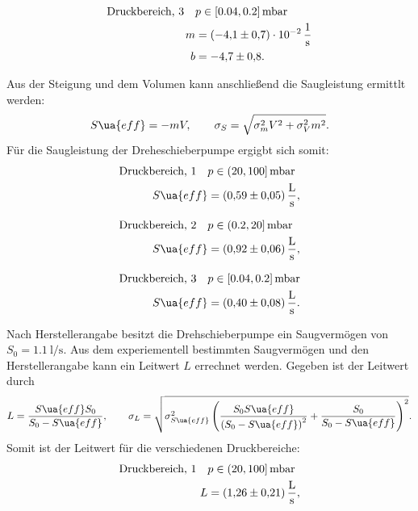 \begin{align}
  \label{eq: regression_dreh_druck_3}
  \begin{aligned}
  \text{Druckbereich, 3} \quad &p\in[0.04,0.2]\,\si{\milli\bar} \\
  m&=\SI{-4.1\pm0.7 e-2}{\per\second} \\
  b&=\num{-4.7 \pm0.8 }.
\end{aligned}
\end{align}

Aus der Steigung und dem Volumen kann anschließend die Saugleistung ermittlt werden:
\begin{equation}
  \label{eq: saug_druck}
  S\ua{eff}=-mV, \qquad \sigma_{S}=\sqrt{\sigma_{m}^{2} V^{2} + \sigma_{V}^{2} m^{2}}.
\end{equation}
Für die Saugleistung der Dreheschieberpumpe ergigbt sich somit:
\begin{align}
  \label{eq:dreh_saug_1}
  \begin{aligned}
  \text{Druckbereich, 1} \quad  &p\in(20,100]\,\si{\milli\bar} \\
   S\ua{eff}&=\SI{0.59\pm 0.05}{\litre\per\second},
\end{aligned}
\end{align}

\begin{align}
  \label{eq:dreh_saug_2}
  \begin{aligned}
  \text{Druckbereich, 2} \quad  &p\in(0.2,20]\,\si{\milli\bar} \\
   S\ua{eff}&=\SI{0.92\pm 0.06}{\litre\per\second},
\end{aligned}
\end{align}

\begin{align}
  \label{eq:dreh_saug_3}
  \begin{aligned}
  \text{Druckbereich, 3} \quad &p\in[0.04,0.2]\,\si{\milli\bar} \\
   S\ua{eff}&=\SI{0.40\pm 0.08}{\litre\per\second}.
\end{aligned}
\end{align}

Nach Herstellerangabe besitzt die Drehschieberpumpe ein Saugvermögen von $S_0=\SI{1.1}{\litre\per\second}$.
Aus dem experiementell bestimmten Saugvermögen und den Herstellerangabe kann ein Leitwert $L$ errechnet werden.
Gegeben ist der Leitwert durch
\begin{equation}
  \label{eq: leitwert}
  L=\frac{S\ua{eff} S_0}{S_0-S\ua{eff}}, \qquad \sigma_L=\sqrt{ \sigma_{S\ua{eff}}^{2} \left(\frac{S_{0} S\ua{eff}}{\left(S_{0} - S\ua{eff}\right)^{2}} + \frac{S_{0}}{S_{0} - S\ua{eff}}\right)^{2}}.
\end{equation}
Somit ist der Leitwert für die verschiedenen Druckbereiche:
\begin{align}
  \label{eq:dreh_leit_1}
  \begin{aligned}
  \text{Druckbereich, 1} \quad  &p\in(20,100]\,\si{\milli\bar} \\
   L&=\SI{1.26\pm 0.21}{\litre\per\second},
\end{aligned}
\end{align}


